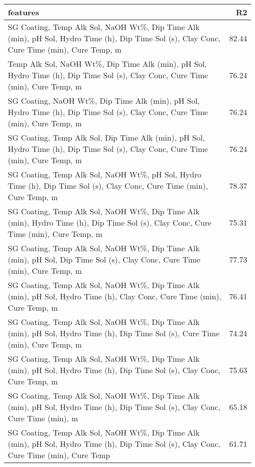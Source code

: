 \begin{longtable}{lr}
\hline
 features                                                                                                                                    &    R2 \\
\hline
 SG Coating, Temp Alk Sol, NaOH Wt\%, Dip Time Alk (min), pH Sol, Hydro Time (h), Dip Time Sol (s), Clay Conc, Cure Time (min), Cure Temp, m & 82.44 \\
 Temp Alk Sol, NaOH Wt\%, Dip Time Alk (min), pH Sol, Hydro Time (h), Dip Time Sol (s), Clay Conc, Cure Time (min), Cure Temp, m             & 76.24 \\
 SG Coating, NaOH Wt\%, Dip Time Alk (min), pH Sol, Hydro Time (h), Dip Time Sol (s), Clay Conc, Cure Time (min), Cure Temp, m               & 76.24 \\
 SG Coating, Temp Alk Sol, Dip Time Alk (min), pH Sol, Hydro Time (h), Dip Time Sol (s), Clay Conc, Cure Time (min), Cure Temp, m            & 76.24 \\
 SG Coating, Temp Alk Sol, NaOH Wt\%, pH Sol, Hydro Time (h), Dip Time Sol (s), Clay Conc, Cure Time (min), Cure Temp, m                     & 78.37 \\
 SG Coating, Temp Alk Sol, NaOH Wt\%, Dip Time Alk (min), Hydro Time (h), Dip Time Sol (s), Clay Conc, Cure Time (min), Cure Temp, m         & 75.31 \\
 SG Coating, Temp Alk Sol, NaOH Wt\%, Dip Time Alk (min), pH Sol, Dip Time Sol (s), Clay Conc, Cure Time (min), Cure Temp, m                 & 77.73 \\
 SG Coating, Temp Alk Sol, NaOH Wt\%, Dip Time Alk (min), pH Sol, Hydro Time (h), Clay Conc, Cure Time (min), Cure Temp, m                   & 76.41 \\
 SG Coating, Temp Alk Sol, NaOH Wt\%, Dip Time Alk (min), pH Sol, Hydro Time (h), Dip Time Sol (s), Cure Time (min), Cure Temp, m            & 74.24 \\
 SG Coating, Temp Alk Sol, NaOH Wt\%, Dip Time Alk (min), pH Sol, Hydro Time (h), Dip Time Sol (s), Clay Conc, Cure Temp, m                  & 75.63 \\
 SG Coating, Temp Alk Sol, NaOH Wt\%, Dip Time Alk (min), pH Sol, Hydro Time (h), Dip Time Sol (s), Clay Conc, Cure Time (min), m            & 65.18 \\
 SG Coating, Temp Alk Sol, NaOH Wt\%, Dip Time Alk (min), pH Sol, Hydro Time (h), Dip Time Sol (s), Clay Conc, Cure Time (min), Cure Temp    & 61.71 \\
\hline
\end{longtable}

